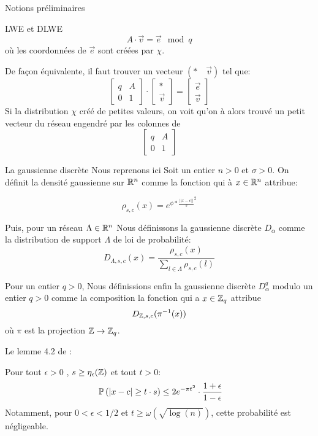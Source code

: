 \begin{section}{Notions préliminaires}
\begin{subsection}{LWE et DLWE}
	\[ A\cdot \vec{v} = \vec{e} \mod q \]
	où les coordonnées de $\vec{e}$ sont créées par $\chi$.

	De façon équivalente, il faut trouver un vecteur $(*\quad\vec{v})$ tel
	que:
	\[ \begin{bmatrix}q & A \\ 0 &1 \end{bmatrix}\cdot
	   \begin{bmatrix}* \\ \vec{v} \end{bmatrix} =
	   \begin{bmatrix} \vec{e} \\ \vec{v} \end{bmatrix} \]
	Si la distribution $\chi$ créé de petites valeurs, on voit qu'on à
	alors trouvé un \og petit \fg vecteur du réseau engendré par les colonnes de 
	\[ \begin{bmatrix}q & A \\ 0 &1 \end{bmatrix} \]
	\end{subsection}

	\begin{subsection}{La gaussienne discrète}
	Nous reprenons ici \cite{STOC:GenPeiVai08}
	Soit un entier $n > 0$  et $\sigma > 0$. On définit la densité
	gaussienne sur $\mathbb{R}^n$ comme la fonction qui à $x\in\mathbb{R}^n$
	attribue:

	\[\rho_{s,c}(x) = e^{\phi * {\frac{||x-c||}{s}}^2} \]

	Puis, pour un réseau $\Lambda \in \mathbb{R}^n$ Nous définissons la gaussienne discrète
	$D_\alpha$ comme la distribution de support $\Lambda$ de loi de
	probabilité: 	
	\[ D_{\Lambda, s, c}(x) = \frac{\rho_{s,c}(x)}{\sum_{l\in \Lambda}\rho_{s,c}(l)}\]
	


	Pour un entier $q > 0$,  
	Nous définissions enfin la gaussienne discrète $D^q_{\alpha}$ modulo un entier $q > 0$ comme la
		composition la fonction qui a $x \in \mathbb{Z}_q$ attribue   
		\[ D_{\mathbb{Z}, s, c}(\pi^{-1}(x)) \]
	où $\pi$ est la projection $\mathbb{Z} \rightarrow \mathbb{Z}_q$.

	Le lemme 4.2 de \cite{STOC:GenPeiVai08}:
	\begin{prop}
	Pour tout $\epsilon > 0$ , $s \geq \eta_{\epsilon}(\mathbb{Z})$ et tout
	$t>0$:
	\[ \PP\left(|x-c| \geq t\cdot s\right) \leq 2 e^{-\pi t^2}
	\cdot \frac{1+\epsilon}{1-\epsilon} \]
	Notamment, pour $0 < \epsilon  < 1/2$ et $t \geq \omega(\sqrt{\log(n)})$, cette probabilité est négligeable.
	\end{prop}
	\end{subsection}
\end{section}
